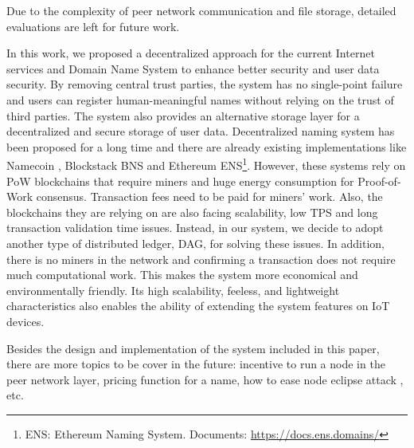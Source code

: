 Due to the complexity of peer network communication and file storage, detailed evaluations are left for future work.

In this work, we proposed a decentralized approach for the current Internet services and Domain Name System to enhance better security and user data security.
By removing central trust parties, the system has no single-point failure and users can register human-meaningful names without relying on the trust of third parties.
The system also provides an alternative storage layer for a decentralized and secure storage of user data.
Decentralized naming system has been proposed for a long time and there are already existing implementations like Namecoin \cite{kalodner2015empirical}, Blockstack BNS \cite{ali2017blockstack} and Ethereum ENS\footnote{ENS: Ethereum Naming System. Documents: \url{https://docs.ens.domains/}}. However, these systems rely on PoW blockchains that require miners and huge energy consumption for Proof-of-Work consensus.
Transaction fees need to be paid for miners' work.
Also, the blockchains they are relying on are also facing scalability, low TPS and long transaction validation time issues.
Instead, in our system, we decide to adopt another type of distributed ledger, DAG, for solving these issues. In addition, there is no miners in the network and confirming a transaction does not require much computational work. This makes the system more economical and environmentally friendly. Its high scalability, feeless, and lightweight characteristics also enables the ability of extending the system features on IoT devices.

Besides the design and implementation of the system included in this paper, there are more topics to be cover in the future: incentive to run a node in the peer network layer, pricing function for a name, how to ease node eclipse attack \cite{singh2006eclipse}, etc.
